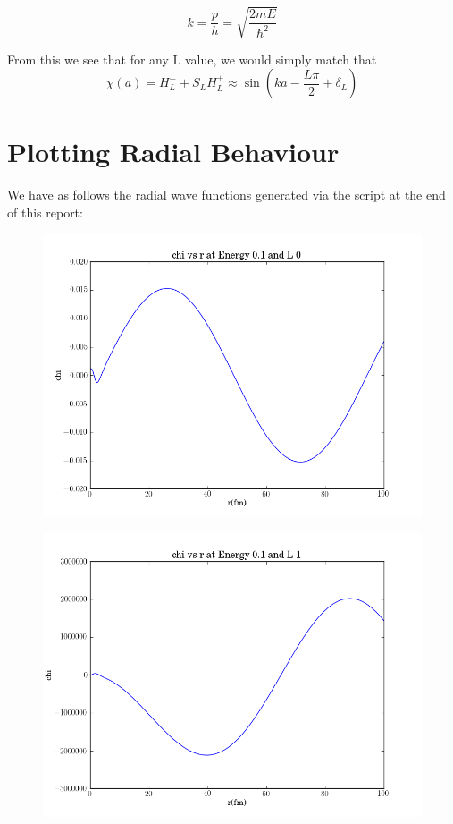 \documentclass[11pt]{article} %
\begin{document}
\begin{equation}
k=\frac{p}{h}=\sqrt{\frac{2mE}{\hbar^2}}
\end{equation}

From this we see that for any L value, we would simply match that\\

\begin{equation}
\chi(a)=H_L^-+S_LH_L^+\approx \sin(ka-\frac{L\pi}{2}+\delta_L)
\end{equation}

\section{Plotting Radial Behaviour}

We have as follows the radial wave functions generated via the script at the end of this report:\\


\vspace{1mm}
\begin{figure}[H]
\centering
\includegraphics[width=.5\linewidth]{"chiE1L0"}
\end{figure}
\vspace{1mm}


\vspace{1mm}
\begin{figure}[H]
\centering
\includegraphics[width=.5\linewidth]{"chiE1L1"}
\end{figure}
\vspace{1mm}
\end{document}
